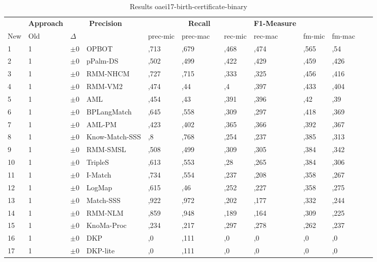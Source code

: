 \begin{table}[htb]
\setlength{\tabcolsep}{0.5em}
\centering
\scriptsize
\begin{tabular}[tb]{lllp{2.3cm}llllllllll}
\noalign{\smallskip}\hline\noalign{\smallskip}
\multicolumn{3}{c}{\textbf{Rank}}& \textbf{Approach}  & \multicolumn{2}{c}{\textbf{Precision}}  & \hspace*{1mm}  & \multicolumn{2}{c}{\textbf{Recall}}  & \hspace*{1mm}  & \multicolumn{2}{c}{\textbf{F1-Measure}}  & \hspace*{1mm} \\
New & Old & $\Delta$ & &prec-mic & prec-mac && rec-mic & rec-mac && fm-mic & fm-mac\\
\noalign{\smallskip}\hline\noalign{\smallskip}
1 & 1 		& $\pm$0 &OPBOT    	&	,713 & ,679 & & ,468 & ,474 & & ,565 & ,54\\
2 & 1 		& $\pm$0 &pPalm-DS    	&	,502 & ,499 & & ,422 & ,429 & & ,459 & ,426\\
3 & 1 		& $\pm$0 &RMM-NHCM    	&	,727 & ,715 & & ,333 & ,325 & & ,456 & ,416\\
4 & 1 		& $\pm$0 &RMM-VM2    	&	,474 & ,44 & & ,4 & ,397 & & ,433 & ,404\\
5 & 1 		& $\pm$0 &AML    	&	,454 & ,43 & & ,391 & ,396 & & ,42 & ,39\\
6 & 1 		& $\pm$0 &BPLangMatch    	&	,645 & ,558 & & ,309 & ,297 & & ,418 & ,369\\
7 & 1 		& $\pm$0 &AML-PM    	&	,423 & ,402 & & ,365 & ,366 & & ,392 & ,367\\
8 & 1 		& $\pm$0 &Know-Match-SSS    	&	,8 & ,768 & & ,254 & ,237 & & ,385 & ,313\\
9 & 1 		& $\pm$0 &RMM-SMSL    	&	,508 & ,499 & & ,309 & ,305 & & ,384 & ,342\\
10 & 1 		& $\pm$0 &TripleS    	&	,613 & ,553 & & ,28 & ,265 & & ,384 & ,306\\
11 & 1 		& $\pm$0 &I-Match    	&	,734 & ,554 & & ,237 & ,208 & & ,358 & ,267\\
12 & 1 		& $\pm$0 &LogMap    	&	,615 & ,46 & & ,252 & ,227 & & ,358 & ,275\\
13 & 1 		& $\pm$0 &Match-SSS    	&	,922 & ,972 & & ,202 & ,177 & & ,332 & ,244\\
14 & 1 		& $\pm$0 &RMM-NLM    	&	,859 & ,948 & & ,189 & ,164 & & ,309 & ,225\\
15 & 1 		& $\pm$0 &KnoMa-Proc    	&	,234 & ,217 & & ,297 & ,278 & & ,262 & ,237\\
16 & 1 		& $\pm$0 &DKP    	&	,0 & ,111 & & ,0 & ,0 & & ,0 & ,0\\
17 & 1 		& $\pm$0 &DKP-lite    	&	,0 & ,111 & & ,0 & ,0 & & ,0 & ,0\\
\end{tabular}
\caption{Results oaei17-birth-certificate-binary}
\label{tbl:results}
\end{table}